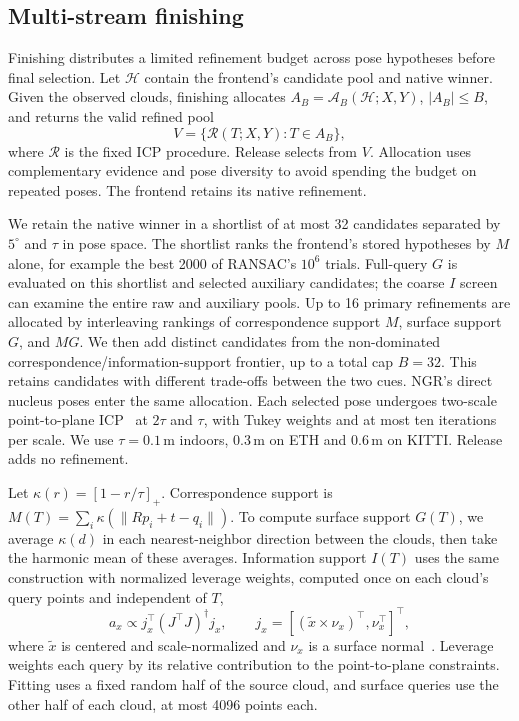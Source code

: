 \subsection{Multi-stream finishing}
\label{sec:finishing}

Finishing distributes a limited refinement budget across pose hypotheses before final selection. Let $\mathcal H$ contain the frontend's candidate pool and native winner. Given the observed clouds, finishing allocates $A_B=\mathcal A_B(\mathcal H;X,Y)$, $|A_B|\le B$, and returns the valid refined pool
\begin{equation}
V=\{\mathcal R(T;X,Y):T\in A_B\},
\label{eq:conversion}
\end{equation}
where $\mathcal R$ is the fixed ICP procedure. Release selects from $V$. Allocation uses complementary evidence and pose diversity to avoid spending the budget on repeated poses. The frontend retains its native refinement.

We retain the native winner in a shortlist of at most 32 candidates separated by $5^\circ$ and $\tau$ in pose space. The shortlist ranks the frontend's stored hypotheses by $M$ alone, for example the best 2000 of RANSAC's $10^6$ trials. Full-query $G$ is evaluated on this shortlist and selected auxiliary candidates; the coarse $I$ screen can examine the entire raw and auxiliary pools. Up to 16 primary refinements are allocated by interleaving rankings of correspondence support $M$, surface support $G$, and $MG$. We then add distinct candidates from the non-dominated correspondence/information-support frontier, up to a total cap $B=32$. This retains candidates with different trade-offs between the two cues. NGR's direct nucleus poses enter the same allocation. Each selected pose undergoes two-scale point-to-plane ICP~\cite{besl1992icp,chen1992medioni} at $2\tau$ and $\tau$, with Tukey weights and at most ten iterations per scale. We use $\tau=0.1$\,m indoors, $0.3$\,m on ETH and $0.6$\,m on KITTI. Release adds no refinement.

Let $\kappa(r)=[1-r/\tau]_+$. Correspondence support is $M(T)=\sum_i\kappa(\|Rp_i+t-q_i\|)$. To compute surface support $G(T)$, we average $\kappa(d)$ in each nearest-neighbor direction between the clouds, then take the harmonic mean of these averages. Information support $I(T)$ uses the same construction with normalized leverage weights, computed once on each cloud's query points and independent of $T$,
\begin{equation}
a_x\propto j_x^\top(J^\top J)^\dagger j_x,\qquad
j_x=[(\widetilde x\times \nu_x)^\top,\nu_x^\top]^\top ,
\end{equation}
where $\widetilde x$ is centered and scale-normalized and $\nu_x$ is a surface normal~\cite{gelfand2003stable}. Leverage weights each query by its relative contribution to the point-to-plane constraints. Fitting uses a fixed random half of the source cloud, and surface queries use the other half of each cloud, at most 4096 points each.

